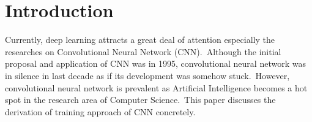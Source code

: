 \section{Introduction}
Currently, deep learning attracts a great deal of attention especially the researches on Convolutional Neural Network (CNN).~Although the initial proposal and application of CNN \cite{lecun1995comparison} was in 1995, convolutional neural network was in silence in last decade as if its development was somehow stuck.~However, convolutional neural network is prevalent as Artificial Intelligence becomes a hot spot in the research area of Computer Science.~This paper discusses the derivation of training approach of CNN concretely.